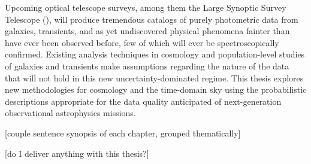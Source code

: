 Upcoming optical telescope surveys, among them the Large Synoptic Survey Telescope (\lsst), will produce tremendous catalogs of purely photometric data from galaxies, transients, and as yet undiscovered physical phenomena fainter than have ever been observed before, few of which will ever be spectroscopically confirmed.
Existing analysis techniques in cosmology and population-level studies of galaxies and transients make assumptions regarding the nature of the data that will not hold in this new uncertainty-dominated regime.
This thesis explores new methodologies for cosmology and the time-domain sky using the probabilistic descriptions appropriate for the data quality anticipated of next-generation observational astrophysics missions. 

[couple sentence synopsis of each chapter, grouped thematically]

[do I deliver anything with this thesis?]
